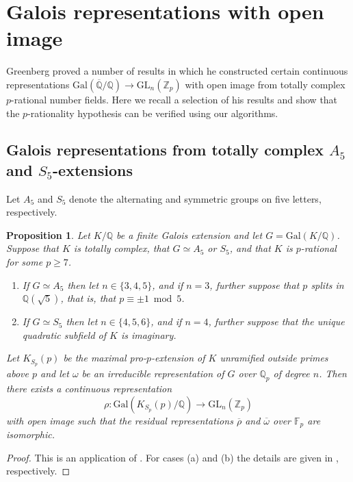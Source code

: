 \documentclass[12pt, a4paper, usenames]{amsart}
\newcommand{\Z}{\mathbb{Z}}
\newcommand{\Q}{\mathbb{Q}}
\newcommand{\F}{\mathbb{F}}
\theoremstyle{plain}
\newtheorem{prop}[theorem]{Proposition}
\theoremstyle{remark}
\theoremstyle{definition}
\newcommand{\Gal}{\mathrm{Gal}}
\newcommand{\GL}{\mathrm{GL}}
\begin{document}
\section{Galois representations with open image}\label{sec:Galois-reps}

Greenberg \cite{MR3512524} proved a number of results in which he
constructed certain continuous representations 
$\Gal(\overline{\Q}/\Q) \longrightarrow \GL_{n}(\Z_{p})$
with open image from totally complex $p$-rational number fields.
Here we recall a selection of his results and show
that the $p$-rationality hypothesis can be verified using our algorithms.

\subsection{Galois representations from totally complex $A_{5}$ and $S_{5}$-extensions}
Let $A_{5}$ and $S_{5}$ denote 
the alternating and symmetric groups on five letters, respectively.

\begin{prop}\label{prop:Galois-reps-A5-S5}
Let $K/\Q$ be a finite Galois extension and let $G = \Gal(K/\Q)$.
Suppose that $K$ is totally complex, that $G \simeq A_{5}$ or $S_{5}$,
and that $K$ is $p$-rational for some $p \geq 7$.
\begin{enumerate}
    \item If $G \simeq A_{5}$ then let $n \in \{ 3,4,5 \}$, and if $n=3$, further suppose that $p$ splits in $\Q(\sqrt{5})$, that is, that $p \equiv \pm 1 \bmod{5}$.
    \item If $G \simeq S_{5}$ then let $n \in \{ 4,5,6 \}$, and if $n=4$, further 
    suppose that the unique quadratic subfield of $K$ is imaginary.
\end{enumerate}
Let $K_{S_{p}}(p)$ be the 
maximal pro-$p$-extension of $K$ unramified outside primes above $p$
and let $\omega$ be an irreducible representation of $G$ over $\Q_{p}$ of degree $n$. 
Then there exists a continuous representation
\[
\rho : \Gal(K_{S_{p}}(p)/\Q) \longrightarrow \mathrm{GL}_{n}(\Z_{p})
\]
with open image such that the residual representations $\overline{\rho}$ 
and $\overline{\omega}$ over $\F_{p}$ are isomorphic.
\end{prop}

\begin{proof}
This is an application of \cite[Proposition~7.1]{MR3512524}.
For cases (a) and (b) the details are given in \cite[7.4.2 and 7.4.1]{MR3512524}, respectively.
\end{proof}
\end{document}
